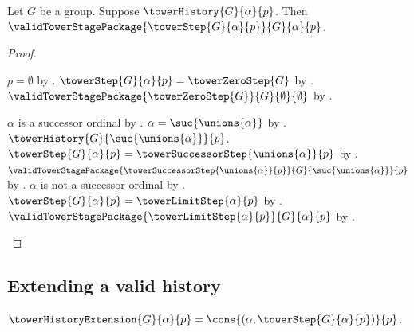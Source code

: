 \begin{theorem}\label{tower_step_valid}
    Let $G$ be a group.
    Suppose $\towerHistory{G}{\alpha}{p}$.
    Then $\validTowerStagePackage
        {\towerStep{G}{\alpha}{p}}{G}{\alpha}{p}$.
\end{theorem}
\begin{proof}
    \begin{byCase}
            $p=\emptyset$ by
                .
            $\towerStep{G}{\alpha}{p}=\towerZeroStep{G}$ by
                .
            $\validTowerStagePackage
                {\towerZeroStep{G}}{G}{\emptyset}{\emptyset}$ by
                .
            \begin{byCase}
                    $\alpha$ is a successor ordinal by
                        .
                    $\alpha=\suc{\unions{\alpha}}$ by
                        .
                    $\towerHistory{G}{\suc{\unions{\alpha}}}{p}$.
                    $\towerStep{G}{\alpha}{p}=
                        \towerSuccessorStep{\unions{\alpha}}{p}$ by
                        .
                    $\validTowerStagePackage
                        {\towerSuccessorStep{\unions{\alpha}}{p}}
                        {G}{\suc{\unions{\alpha}}}{p}$ by
                        .
                    $\alpha$ is not a successor ordinal by
                        .
                    $\towerStep{G}{\alpha}{p}=
                        \towerLimitStep{\alpha}{p}$ by
                        .
                    $\validTowerStagePackage
                        {\towerLimitStep{\alpha}{p}}{G}{\alpha}{p}$ by
                        .
            \end{byCase}
    \end{byCase}
\end{proof}

\subsection{Extending a valid history}

\begin{definition}\label{tower_history_extension}
    $\towerHistoryExtension{G}{\alpha}{p}=
        \cons{(\alpha,\towerStep{G}{\alpha}{p})}{p}$.
\end{definition}

